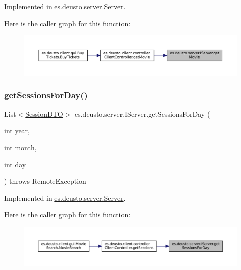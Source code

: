 Implemented in \mbox{\hyperlink{classes_1_1deusto_1_1server_1_1_server_a7e4544c63bcf2b2d3abce0d2ff1567ac}{es.\+deusto.\+server.\+Server}}.

Here is the caller graph for this function\+:
\nopagebreak
\begin{figure}[H]
\begin{center}
\leavevmode
\includegraphics[width=350pt]{interfacees_1_1deusto_1_1server_1_1_i_server_a2b7883e416d98a7c92de13cbed7af450_icgraph}
\end{center}
\end{figure}
\mbox{\label{interfacees_1_1deusto_1_1server_1_1_i_server_aac50d6a77e30df4d4c15fcaf4ba979f5}} 
\subsubsection{\texorpdfstring{getSessionsForDay()}{getSessionsForDay()}}
{\footnotesize\ttfamily List$<$\mbox{\hyperlink{classes_1_1deusto_1_1server_1_1data_1_1_session_d_t_o}{Session\+D\+TO}}$>$ es.\+deusto.\+server.\+I\+Server.\+get\+Sessions\+For\+Day (\begin{DoxyParamCaption}\item[{int}]{year,  }\item[{int}]{month,  }\item[{int}]{day }\end{DoxyParamCaption}) throws Remote\+Exception}



Implemented in \mbox{\hyperlink{classes_1_1deusto_1_1server_1_1_server_a688ca336b3cbdb5c04ecdc4f23ff65d1}{es.\+deusto.\+server.\+Server}}.

Here is the caller graph for this function\+:
\nopagebreak
\begin{figure}[H]
\begin{center}
\leavevmode
\includegraphics[width=350pt]{interfacees_1_1deusto_1_1server_1_1_i_server_aac50d6a77e30df4d4c15fcaf4ba979f5_icgraph}
\end{center}
\end{figure}
\mbox{\label{interfacees_1_1deusto_1_1server_1_1_i_server_a33dc65de2a567be10bf2477ee28765f8}} 

